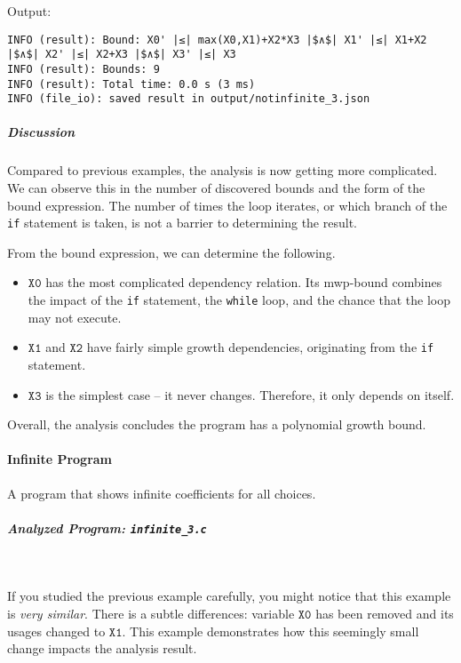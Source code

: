 Output:

\begin{lstlisting}[escapeinside=||,label={lst:ex3-output}]
INFO (result): Bound: X0' |≤| max(X0,X1)+X2*X3 |$∧$| X1' |≤| X1+X2 |$∧$| X2' |≤| X2+X3 |$∧$| X3' |≤| X3
INFO (result): Bounds: 9
INFO (result): Total time: 0.0 s (3 ms)
INFO (file_io): saved result in output/notinfinite_3.json
\end{lstlisting}

\subparagraph*{Discussion}\label{discussion}

Compared to previous examples, the analysis is now getting more complicated.
We can observe this in the number of discovered bounds and the form of the bound expression.
The number of times the loop iterates, or which branch of the \texttt{if} statement is taken, is not a barrier to determining the result.

From the bound expression, we can determine the following.

\begin{itemize}
\item \(\texttt{X0}\) has the most complicated dependency relation.
Its mwp-bound combines the impact of the \texttt{if} statement, the \texttt{while} loop, and the chance that the loop may not execute.

\item \(\texttt{X1}\) and \(\texttt{X2}\) have fairly simple growth dependencies, originating from the \texttt{if} statement.

\item \(\texttt{X3}\) is the simplest case -- it never changes.
Therefore, it only depends on itself.
\end{itemize}

Overall, the analysis concludes the program has a polynomial growth bound.
\pagebreak

\paragraph{Infinite Program}\label{inf-prog}
A program that shows infinite coefficients for all choices.

\subparagraph*{Analyzed Program: \texttt{infinite\_3.c}}\mbox{}\\
\begin{minipage}{\textwidth}

\end{minipage}


If you studied the previous example carefully, you might notice that this example is \emph{very similar}.
There is a subtle differences: variable \(\texttt{X0}\) has been removed and its usages changed to \(\texttt{X1}\).
This example demonstrates how this seemingly small change impacts the analysis result.

